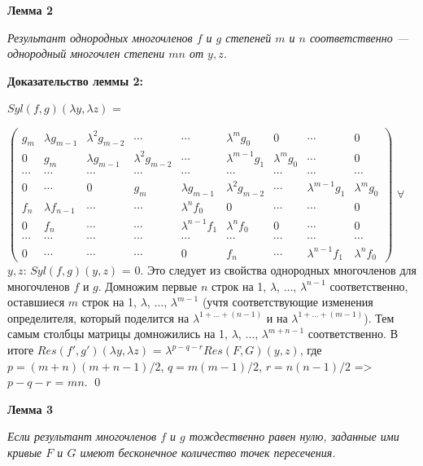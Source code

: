 \documentclass[a4paper, 12pt]{article}
\begin{document}
\smallskip
\textbf{Лемма 2}

\textit{Результант однородных многочленов $f$ и $g$ степеней $m$ и $n$ соответственно --- однородный многочлен степени $mn$ от $y,z$.}

\textbf{Доказательство леммы 2:}\newline

$Syl(f,g)(\lambda y,\lambda z)$ =

$\begin{pmatrix}
g_m & \lambda g_{m-1} & \lambda^{2} g_{m-2} & \cdots & \cdots & \lambda^{m}g_0 & 0 & \cdots & 0 \\
0 & g_m & \lambda g_{m-1} & \lambda^{2} g_{m-2} & \cdots & \lambda^{m-1} g_1 & \lambda^{m} g_0 & \cdots & 0 \\
\cdots & \cdots & \cdots & \cdots & \cdots & \cdots & \cdots & \cdots & \cdots \\
0 & \cdots & 0 & g_m & \lambda g_{m-1} & \lambda^{2} g_{m-2} & \cdots & \lambda^{m-1} g_1 & \lambda^{m} g_0 \\
f_n & \lambda f_{n-1} & \cdots & \cdots & \lambda^{n} f_0 & 0 & \cdots & \cdots & 0 \\
0 & f_n & \cdots & \cdots & \lambda^{n-1} f_1 & \lambda^{n} f_0 & 0 & \cdots & 0 \\
\cdots & \cdots & \cdots & \cdots & \cdots & \cdots & \cdots & \cdots & \cdots \\
0 & \cdots & \cdots & \cdots & 0 & f_n & \cdots & \lambda^{n-1} f_1 & \lambda^{n} f_0
\end{pmatrix}$\newline
$\forall$ $y,z$: $Syl(f,g)(y,z)$ = $0$. Это следует из свойства однородных многочленов для многочленов $f$ и $g$.
\newline
Домножим первые $n$ строк на 1, $\lambda$, $\dots$, $\lambda^{n-1}$ соответственно, оставшиеся $m$ строк на 1, $\lambda$, $\dots$, $\lambda^{m-1}$ (учтя соответствующие изменения определителя, который поделится на $\lambda^{1 +\dots + (n-1)}$ и на $\lambda^{1 +\dots + (m-1)}$).
Тем самым столбцы матрицы домножились на 1, $\lambda$, $\dots$, $\lambda^{m + n - 1}$ соответственно.\newline
В итоге $Res(f',g')(\lambda y,\lambda z)$ = $\lambda^{p-q-r}Res(F,G)(y,z)$, где $p = (m+n)(m+n-1)/2$, $q = m(m-1)/2 $, $r = n(n-1)/2$ => $p-q-r$ = $mn$.
\qed

\smallskip
\textbf{Лемма 3}

\textit{Если результант многочленов $f$ и $g$ тождественно равен нулю, заданные ими кривые $F$ и $G$ имеют бесконечное количество точек пересечения.}
\end{document}
